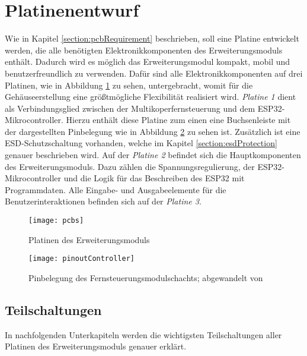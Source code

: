 \section{Platinenentwurf}
\label{section:pcbImplementation}
Wie in Kapitel \ref{section:pcbRequirement} beschrieben, soll eine Platine entwickelt werden, die alle benötigten Elektronikkomponenten des Erweiterungsmoduls enthält. Dadurch wird es möglich das Erweiterungsmodul kompakt, mobil und benutzerfreundlich zu verwenden. Dafür sind alle Elektronikkomponenten auf drei Platinen, wie in Abbildung \ref{fig:pcbs} zu sehen, untergebracht, womit für die Gehäuseerstellung eine größtmögliche Flexibilität realisiert wird. \textit{Platine 1} dient als Verbindungsglied zwischen der Multikoperfernsteuerung und dem ESP32-Mikrocontroller. Hierzu enthält diese Platine zum einen eine Buchsenleiste mit der dargestellten Pinbelegung wie in Abbildung \ref{fig:pinoutController} zu sehen ist. Zusätzlich ist eine \ac{ESD}-Schutzschaltung vorhanden, welche im Kapitel \ref{section:esdProtection} genauer beschrieben wird. Auf der \textit{Platine 2} befindet sich die Hauptkomponenten des Erweiterungsmoduls. Dazu zählen die Spannungsregulierung, der ESP32-Mikrocontroller und die Logik für das Beschreiben des ESP32 mit Programmdaten. Alle Eingabe- und Ausgabeelemente für die Benutzerinteraktionen befinden sich auf der \textit{Platine 3}.

\begin{figure}[h]
    \centering
    \texttt{[image: pcbs]}
    \caption{Platinen des Erweiterungsmoduls}
    \label{fig:pcbs}
\end{figure}

\begin{figure}[h]
    \centering
    \texttt{[image: pinoutController]}
    \caption{Pinbelegung des Fernsteuerungsmodulschachts; abgewandelt von \cite{liteModulePinout}}
    \label{fig:pinoutController}
\end{figure}

\subsection{Teilschaltungen}
In nachfolgenden Unterkapiteln werden die wichtigsten Teilschaltungen aller Platinen des Erweiterungsmoduls genauer erklärt.

